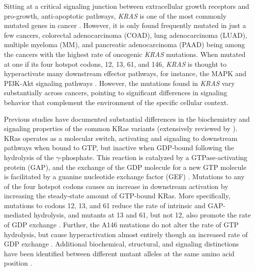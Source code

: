\documentclass[english, 10pt, letterpaper]{article}
\newcommand{\KRAS}{\emph{KRAS}}
\newcommand{\kras}{KRas}
\begin{document}
Sitting at a critical signaling junction between extracellular growth receptors and pro-growth, anti-apoptotic pathways, \KRAS{} is one of the most commonly mutated genes in cancer \cite{Barbacid1987, Bailey2018}.
However, it is only found frequently mutated in just a few cancers, colorectal adenocarcinoma (COAD), lung adenocarcinoma (LUAD), multiple myeloma (MM), and pancreatic adenocarcinoma (PAAD) being among the cancers with the highest rate of oncogenic \KRAS{} mutations.
When mutated at one if its four hotspot codons, 12, 13, 61, and 146, \KRAS{} is thought to hyperactivate many downstream effector pathways, for instance, the MAPK and PI3K-Akt signaling pathways \cite{Simanshu2017}.
However, the mutations found in \KRAS{} vary substantially across cancers, pointing to significant differences in signaling behavior that complement the environment of the specific cellular context.

Previous studies have documented substantial differences in the biochemistry and signaling properties of the common \kras{} variants (extensively reviewed by \cite{Miller2012, Li2018}).
\kras{} operates as a molecular switch, activating and signaling to downstream pathways when bound to GTP, but inactive when GDP-bound following the hydrolysis of the $\gamma$-phosphate.
This reaction is catalyzed by a GTPase-activating protein (GAP), and the exchange of the GDP molecule for a new GTP molecule is facilitated by a guanine nucleotide exchange factor (GEF) \cite{Barbacid1987}.
Mutations to any of the four hotspot codons causes an increase in downstream activation by increasing the steady-state amount of GTP-bound \kras{}.
More specifically, mutations to codons 12, 13, and 61 reduce the rate of intrinsic and GAP-mediated hydrolysis, and mutants at 13 and 61, but not 12, also promote the rate of GDP exchange \cite{Hunter2015a, Smith2013}.
Further, the A146 mutations do not alter the rate of GTP hydrolysis, but cause hyperactivation almost entirely though an increased rate of GDP exchange \cite{Feig1988RelationshipProteins., Edkins2006, Janakiraman2010, Poulin2019}.
Additional biochemical, structural, and signaling distinctions have been identified between different mutant alleles at the same amino acid position \cite{Li2018, Hunter2015a, Poulin2019, Hobbs2019AtypicalCancer., Yu2018, Kovalski2019, Ihle2012, Spoerner2004, Smith2014a, Pantsar2018}.
\end{document}
